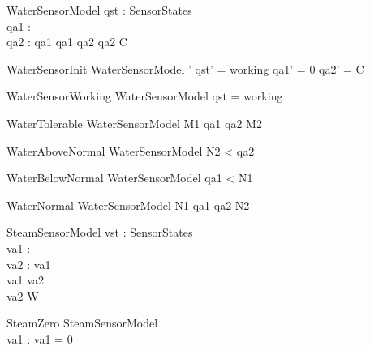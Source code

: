
\begin{schema}{WaterSensorModel}
         qst : SensorStates\\ 
         qa1 : \nat \\
         qa2 : \nat 
{} \leq qa1  \land 
         qa1 \leq qa2 \land   
         qa2 \leq C 

\end{schema}

\begin{schema}{WaterSensorInit}
         WaterSensorModel '
\where
         qst' = working \land 
         qa1' = 0      \land 
         qa2' = C
\end{schema}



\begin{schema}{WaterSensorWorking}
WaterSensorModel 
\where qst = working 
\end{schema}

\begin{schema}{WaterTolerable} 
WaterSensorModel 
\where M1 \leq qa1 \land qa2 \leq  M2
\end{schema}

\begin{schema}{WaterAboveNormal} 
WaterSensorModel 
\where N2 < qa2  
\end{schema}

\begin{schema}{WaterBelowNormal} 
WaterSensorModel 
\where qa1 < N1  
\end{schema}

\begin{schema}{WaterNormal}  
WaterSensorModel 
\where N1 \leq  qa1 \land qa2 \leq N2 
\end{schema} 

 
\begin{schema}{SteamSensorModel} 
        vst : SensorStates\\ 
        va1 : \nat\\ 
        va2 : \nat
{} \leq va1  \\  
        va1 \leq  va2 \\  
        va2 \leq W  
\end{schema}


\begin{schema}{SteamZero}
       SteamSensorModel\\ 
       va1 : \nat
\where       
       va1 = 0 
\end{schema}

